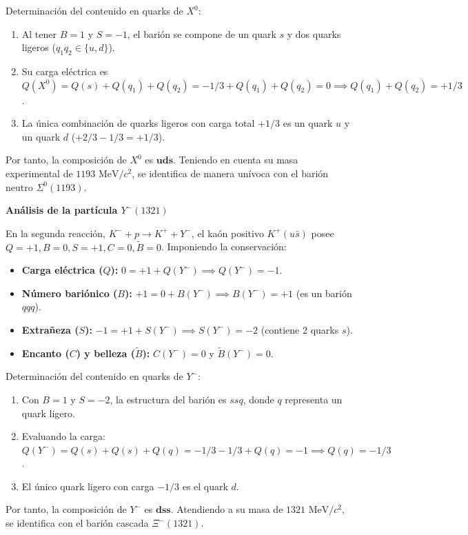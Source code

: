 \begin{problema}
Determinación del contenido en quarks de $X^0$:
\begin{enumerate}[label=\arabic*.]
    \item Al tener $B = 1$ y $S = -1$, el barión se compone de un quark $s$ y dos quarks ligeros ($q_1 q_2 \in \{u, d\}$).
    \item Su carga eléctrica es $Q(X^0) = Q(s) + Q(q_1) + Q(q_2) = -1/3 + Q(q_1) + Q(q_2) = 0 \implies Q(q_1) + Q(q_2) = +1/3$.
    \item La única combinación de quarks ligeros con carga total $+1/3$ es un quark $u$ y un quark $d$ ($+2/3 - 1/3 = +1/3$).
\end{enumerate}
Por tanto, la composición de $X^0$ es $\mathbf{uds}$. Teniendo en cuenta su masa experimental de $1193 \text{ MeV}/c^2$, se identifica de manera unívoca con el barión neutro \textbf{$\Sigma^0(1193)$}.

\textbf{Análisis de la partícula $Y^-(1321)$}

En la segunda reacción, $K^- + p \longrightarrow K^+ + Y^-$, el kaón positivo $K^+ (u\bar{s})$ posee $Q = +1, B = 0, S = +1, C = 0, \tilde{B} = 0$. Imponiendo la conservación:
\begin{itemize}
    \item \textbf{Carga eléctrica ($Q$):} $0 = +1 + Q(Y^-) \implies Q(Y^-) = -1$.
    \item \textbf{Número bariónico ($B$):} $+1 = 0 + B(Y^-) \implies B(Y^-) = +1$ (es un barión $qqq$).
    \item \textbf{Extrañeza ($S$):} $-1 = +1 + S(Y^-) \implies S(Y^-) = -2$ (contiene 2 quarks $s$).
    \item \textbf{Encanto ($C$) y belleza ($\tilde{B}$):} $C(Y^-) = 0$ y $\tilde{B}(Y^-) = 0$.
\end{itemize}

Determinación del contenido en quarks de $Y^-$:
\begin{enumerate}[label=\arabic*.]
    \item Con $B = 1$ y $S = -2$, la estructura del barión es $ssq$, donde $q$ representa un quark ligero.
    \item Evaluando la carga: $Q(Y^-) = Q(s) + Q(s) + Q(q) = -1/3 - 1/3 + Q(q) = -1 \implies Q(q) = -1/3$.
    \item El único quark ligero con carga $-1/3$ es el quark $d$.
\end{enumerate}
Por tanto, la composición de $Y^-$ es $\mathbf{dss}$. Atendiendo a su masa de $1321 \text{ MeV}/c^2$, se identifica con el barión cascada \textbf{$\Xi^-(1321)$}.


\end{problema}
